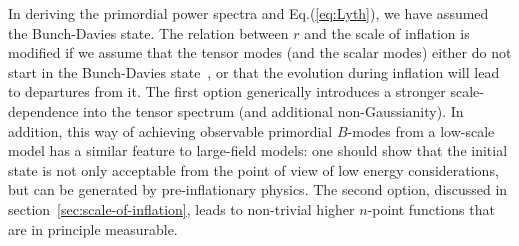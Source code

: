 
In deriving the primordial power spectra and Eq.(\ref{eq:Lyth}), we have assumed the Bunch-Davies state. The relation between $r$ and the scale of inflation is modified if we assume that the tensor  modes (and the scalar modes) either do not start in the Bunch-Davies state~\cite{Ashoorioon:2014nta,Collins:2014yua}, or that the evolution during inflation will lead to departures from it. The first option generically introduces a stronger scale-dependence into the tensor spectrum \cite{Aravind:2014axa,Flauger:2013hra} (and additional non-Gaussianity). In addition, this way of achieving observable primordial $B$-modes from a low-scale model has a similar feature to large-field models: one should show that the initial state is not only acceptable from the point of view of low energy considerations, but can be generated by pre-inflationary physics. The second option, discussed in section~\ref{sec:scale-of-inflation}, leads to non-trivial higher $n$-point functions that are in principle measurable.

